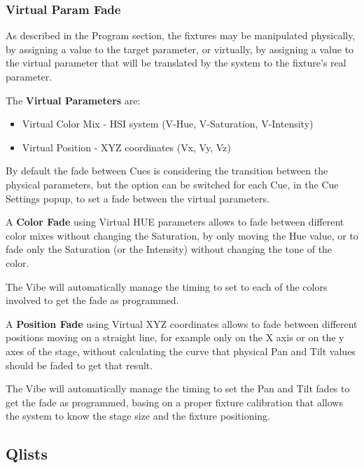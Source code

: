 \documentclass[
]{article}
\begin{document}
\hypertarget{virtual-param-fade}{%
\subsubsection{Virtual Param Fade}\label{virtual-param-fade}}

As described in the Program section, the fixtures may be manipulated physically, by assigning a value to the target parameter, or virtually, by assigning a value to the virtual parameter that will be translated by the system to the fixture's real parameter.

The \textbf{Virtual Parameters} are:

\begin{itemize}
\item
  Virtual Color Mix - HSI system (V-Hue, V-Saturation, V-Intensity)
\item
  Virtual Position - XYZ coordinates (Vx, Vy, Vz)
\end{itemize}

By default the fade between Cues is considering the transition between the physical parameters, but the option can be switched for each Cue, in the Cue Settings popup, to set a fade between the virtual parameters.

A \textbf{Color Fade} using Virtual HUE parameters allows to fade between different color mixes without changing the Saturation, by only moving the Hue value, or to fade only the Saturation (or the Intensity) without changing the tone of the color.

The Vibe will automatically manage the timing to set to each of the colors involved to get the fade as programmed.

A \textbf{Position Fade} using Virtual XYZ coordinates allows to fade between different positions moving on a straight line, for example only on the X axis or on the y axes of the stage, without calculating the curve that physical Pan and Tilt values should be faded to get that result.

The Vibe will automatically manage the timing to set the Pan and Tilt fades to get the fade as programmed, basing on a proper fixture calibration that allows the system to know the stage size and the fixture positioning.

\hypertarget{Qlists-10.5}{%
\subsection{Qlists}\label{Qlists-10.5}}
\end{document}

